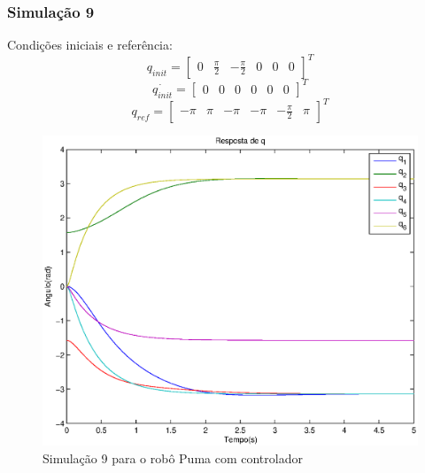 \documentclass{article}
\begin{document}
\subsubsection{Simulação 9}
Condições iniciais e referência:
\begin{equation}
\label{eq:sim9q}
q_{init}=\begin{bmatrix}
0 & \frac{\pi}{2} & -\frac{\pi}{2} & 0 & 0 & 0
\end{bmatrix}^T
\end{equation}
\begin{equation}
\label{eq:sim9qd}
\dot{q_{init}}=\begin{bmatrix}
0 & 0 & 0 & 0 & 0 & 0
\end{bmatrix}^T
\end{equation}
\begin{equation}
\label{eq:sim9qr}
q_{ref}=\begin{bmatrix}
-\pi & \pi & -\pi & -\pi & -\frac{\pi}{2} & \pi
\end{bmatrix}^T
\end{equation}

\begin{figure}[H]
	\centering
	\includegraphics[width=0.8\linewidth]{../sim3cl}
	\caption{Simulação 9 para o robô Puma com controlador}
	\label{fig:pumasim9}
\end{figure}
\end{document}
